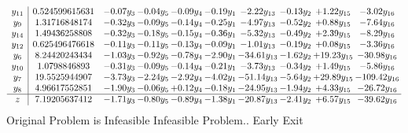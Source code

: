 \documentclass[9pt]{article}
\begin{document}
\[\begin{array}{c| c c@{\hskip 2pt} c@{\hskip 2pt} c@{\hskip 2pt} c@{\hskip 2pt} c@{\hskip 2pt} c@{\hskip 2pt} c@{\hskip 2pt} c@{\hskip 2pt} }
 y_{11}   &  0.524599615631 & -0.07 y_{3} & -0.04 y_{5} & -0.09 y_{4} & -0.19 y_{1} & -2.22 y_{13} & -0.13 y_{2} & +  1.22 y_{15} & -3.02 y_{16}\\
 y_{9}   &  1.31716848174 & -0.32 y_{3} & -0.09 y_{5} & -0.14 y_{4} & -0.25 y_{1} & -4.97 y_{13} & -0.52 y_{2} & +  0.88 y_{15} & -7.64 y_{16}\\
 y_{14}   &  1.49436258808 & -0.32 y_{3} & -0.18 y_{5} & -0.15 y_{4} & -0.36 y_{1} & -5.32 y_{13} & -0.49 y_{2} & +  2.39 y_{15} & -8.29 y_{16}\\
 y_{12}   &  0.625496476618 & -0.11 y_{3} & -0.11 y_{5} & -0.13 y_{4} & -0.09 y_{1} & -1.01 y_{13} & -0.19 y_{2} & +  0.08 y_{15} & -3.36 y_{16}\\
 y_{6}   &  8.24420243434 & -1.03 y_{3} & -0.92 y_{5} & -0.78 y_{4} & -2.90 y_{1} & -34.61 y_{13} & -1.62 y_{2} & + 19.23 y_{15} & -30.98 y_{16}\\
 y_{10}   &  1.0798846893 & -0.31 y_{3} & -0.09 y_{5} & -0.14 y_{4} & -0.21 y_{1} & -3.73 y_{13} & -0.34 y_{2} & +  1.49 y_{15} & -5.86 y_{16}\\
 y_{7}   &  19.5525944907 & -3.73 y_{3} & -2.24 y_{5} & -2.92 y_{4} & -4.02 y_{1} & -51.14 y_{13} & -5.64 y_{2} & + 29.89 y_{15} & -109.42 y_{16}\\
 y_{8}   &  4.96617552851 & -1.90 y_{3} & -0.06 y_{5} & +  0.12 y_{4} & -0.18 y_{1} & -24.95 y_{13} & -1.94 y_{2} & +  4.33 y_{15} & -26.72 y_{16}\\
\hline
z    &  7.19205637412 & -1.71 y_{3} & -0.80 y_{5} & -0.89 y_{4} & -1.38 y_{1} & -20.87 y_{13} & -2.41 y_{2} & +  6.57 y_{15} & -39.62 y_{16}\\
\end{array}\]
Original Problem is Infeasible
Infeasible Problem.. Early Exit
\end{document}
